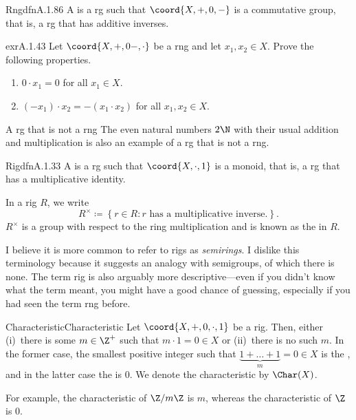 \begin{dfn}{Rng}{dfnA.1.86}
A  is a rg such that $\coord{X,+,0,-}$ is a commutative group, that is, a rg that has additive inverses.
\end{dfn}
\begin{exr}{}{exrA.1.43}
Let $\coord{X,+,0-,\cdot}$ be a rng and let $x_1,x_2\in X$.  Prove the following properties.
\begin{enumerate}
\item $0\cdot x_1=0$ for all $x_1\in X$.
\item $(-x_1)\cdot x_2=-(x_1\cdot x_2)$ for all $x_1,x_2\in X$.
\end{enumerate}
\end{exr}
\begin{exm}{A rg that is not a rng}{}
The even natural numbers $2\N$ with their usual addition and multiplication is also an example of a rg that is not a rng.
\end{exm}
\begin{dfn}{Rig}{dfnA.1.33}
A  is a rg such that $\coord{X,\cdot ,1}$ is a monoid, that is, a rg that has a multiplicative identity.
\begin{rmk}
In a rig $R$, we write
\begin{equation}\label{eqnA.1.34}
    R^{\times}\coloneqq \left\{ r\in R:r\text{ has a multiplicative inverse.}\right\} .
\end{equation}
$R^{\times}$ is a group with respect to the ring multiplication and is known as the  in $R$.
\end{rmk}
\begin{rmk}
I believe it is more common to refer to rigs as \emph{semirings}.  I dislike this terminology because it suggests an analogy with semigroups, of which there is none.  The term rig is also arguably more descriptive---even if you didn't know what the term meant, you might have a good chance of guessing, especially if you had seen the term rng before.
\end{rmk}
\end{dfn}
\begin{dfn}{Characteristic}{Characteristic}
Let $\coord{X,+,0,\cdot ,1}$ be a rig.  Then, either (i)~there is some $m\in \Z ^+$ such that $m\cdot 1=0\in X$ or (ii)~there is no such $m$.  In the former case, the smallest positive integer such that $\underbrace{1+\dots +1}_m=0\in X$ is the , and in the latter case the  is $0$.  We denote the characteristic by $\Char (X)$.
\begin{rmk}
For example, the characteristic of $\Z /m\Z$ is $m$, whereas the characteristic of $\Z$ is $0$.
\end{rmk}
\end{dfn}
